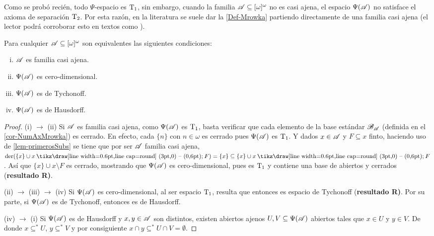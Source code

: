 Como se probó recién, todo $\Psi$-espacio es $\operatorname{T}_1$, sin embargo, cuando la familia $\mathscr{A} \subseteq [\omega]^\omega$ no es casi ajena, el espacio $\Psi(\mathscr{A})$ no satisface el axioma de separación $\operatorname{T}_2$. Por esta razón, en la literatura se suele dar la \autoref{Def-Mrowka} partiendo directamente de una familia casi ajena (el lector podrá corroborar esto en textos como \cite{hruMrowka,hruAlmost,kannanHereditarily}).

\begin{proposicion}\label{prop-tra-casiAjenidad}
	Para cualquier $\mathscr{A}\subseteq [\omega]^\omega$ son equivalentes las siguientes condiciones:
	\begin{enumerate}[i)]
		\item $\mathscr{A}$ es familia casi ajena.
		\item $\Psi(\mathscr{A})$ es cero-dimensional.
		\item $\Psi(\mathscr{A})$ es de Tychonoff.
		\item $\Psi(\mathscr{A})$ es de Hausdorff.
	\end{enumerate}
\end{proposicion}

\begin{proof}
	(i) $\rightarrow$ (ii) Si $\mathscr{A}$ es familia casi ajena, como $\Psi(\mathscr{A})$ es $\operatorname{T}_1$, basta verificar que cada elemento de la base estándar $\mathscr{B}_{\mathscr{A}}$ (definida en el \autoref{cor-NumAxMrowka}) es cerrado. En efecto, cada $\{n\}$ con $n \in \omega$ es cerrado pues $\Psi(\mathscr{A})$ es $\operatorname{T}_1$. Y dados $x \in \mathscr{A}$ y $F \subseteq x$ finto, haciendo uso de \ref{lem-primerosSubs} se tiene que por ser $\mathscr{A}$ familia casi ajena, $\der(\{x\} \cup x \setminus F)=\{x\} \subseteq \{x\} \cup x \setminus F$. Así que $\{x\} \cup x \setminus F$ es cerrado, mostrando que $\Psi(\mathscr{A})$ es cero-dimensional, pues es $\operatorname{T}_1$ y contiene una base de abiertos y cerrados (\textbf{resultado R)}.

	(ii) $\rightarrow$ (iii) $\rightarrow$ (iv) Si $\Psi(\mathscr{A})$ es cero-dimensional, al ser espacio $\operatorname{T}_1$, resulta que entonces es espacio de Tychonoff (\textbf{resultado R)}. Por su parte, si $\Psi(\mathscr{A})$ es de Tychonoff, entonces es de Hausdorff.

	(iv) $\rightarrow$ (i) Si $\Psi(\mathscr{A})$ es de Hausdorff y $x,y \in \mathscr{A}$ son distintos, existen abiertos ajenos $U,V \subseteq \Psi(\mathscr{A})$ abiertos tales que $x \in U$ y $y \in V$. De donde $x \subseteq^* U$, $y \subseteq^* V$ y por consiguiente $x \cap y \subseteq^* U \cap V = \emptyset$.
\end{proof}

